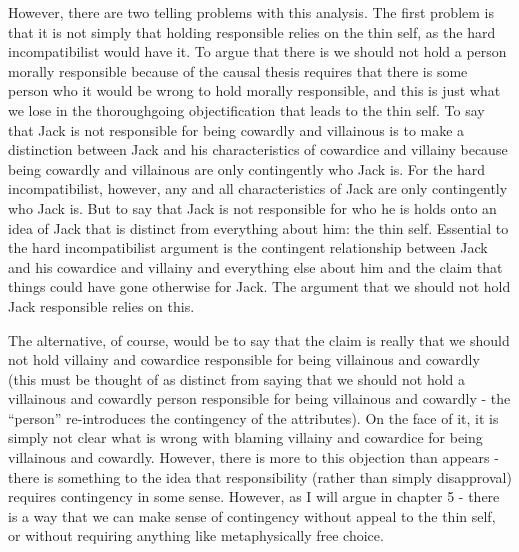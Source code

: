 \documentclass[phd,12pt,oneside,paper=letterpaper]{ubcthesis}
\begin{document}
However, there are two telling problems with this analysis. The first problem is that it is not simply that holding responsible relies on the thin self, as the hard incompatibilist would have it. To argue that there is we should not hold a person morally responsible because of the causal thesis requires that there is some person who it would be wrong to hold morally responsible, and this is just what we lose in the thoroughgoing objectification that leads to the thin self. To say that Jack is not responsible for being cowardly and villainous is to make a distinction between Jack and his characteristics of cowardice and villainy because being cowardly and villainous are only contingently who Jack is. For the hard incompatibilist, however, any and all characteristics of Jack are only contingently who Jack is. But to say that Jack is not responsible for who he is holds onto an idea of Jack that is distinct from everything about him: the thin self.  Essential to the hard incompatibilist argument is the contingent relationship between Jack and his cowardice and villainy and everything else about him and the claim that things could have gone otherwise for Jack. The argument that we should not hold Jack responsible relies on this.

The alternative, of course, would be to say that the claim is really that we should not hold villainy and cowardice responsible for being villainous and cowardly (this must be thought of as distinct from saying that we should not hold a villainous and cowardly person responsible for being villainous and cowardly - the ``person'' re-introduces the contingency of the attributes). On the face of it, it is simply not clear what is wrong with blaming villainy and cowardice for being villainous and cowardly. However, there is more to this objection than appears - there is something to the idea that responsibility (rather than simply disapproval) requires contingency in some sense. However, as I will argue in chapter 5 - there is a way that we can make sense of contingency without appeal to the thin self, or without requiring anything like metaphysically free choice. 
\end{document}
